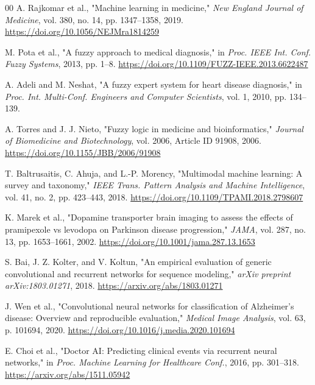 \documentclass[conference]{IEEEtran}
\begin{document}
\begin{thebibliography}{00}
A. Rajkomar et al., "Machine learning in medicine," \textit{New England Journal of Medicine}, vol. 380, no. 14, pp. 1347--1358, 2019. \href{https://doi.org/10.1056/NEJMra1814259}{https://doi.org/10.1056/NEJMra1814259}

M. Pota et al., "A fuzzy approach to medical diagnosis," in \textit{Proc. IEEE Int. Conf. Fuzzy Systems}, 2013, pp. 1--8. \href{https://doi.org/10.1109/FUZZ-IEEE.2013.6622487}{https://doi.org/10.1109/FUZZ-IEEE.2013.6622487}

A. Adeli and M. Neshat, "A fuzzy expert system for heart disease diagnosis," in \textit{Proc. Int. Multi-Conf. Engineers and Computer Scientists}, vol. 1, 2010, pp. 134--139.

A. Torres and J. J. Nieto, "Fuzzy logic in medicine and bioinformatics," \textit{Journal of Biomedicine and Biotechnology}, vol. 2006, Article ID 91908, 2006. \href{https://doi.org/10.1155/JBB/2006/91908}{https://doi.org/10.1155/JBB/2006/91908}

T. Baltrusaitis, C. Ahuja, and L.-P. Morency, "Multimodal machine learning: A survey and taxonomy," \textit{IEEE Trans. Pattern Analysis and Machine Intelligence}, vol. 41, no. 2, pp. 423--443, 2018. \href{https://doi.org/10.1109/TPAMI.2018.2798607}{https://doi.org/10.1109/TPAMI.2018.2798607}

K. Marek et al., "Dopamine transporter brain imaging to assess the effects of pramipexole vs levodopa on Parkinson disease progression," \textit{JAMA}, vol. 287, no. 13, pp. 1653--1661, 2002. \href{https://doi.org/10.1001/jama.287.13.1653}{https://doi.org/10.1001/jama.287.13.1653}

S. Bai, J. Z. Kolter, and V. Koltun, "An empirical evaluation of generic convolutional and recurrent networks for sequence modeling," \textit{arXiv preprint arXiv:1803.01271}, 2018. \href{https://arxiv.org/abs/1803.01271}{https://arxiv.org/abs/1803.01271}

J. Wen et al., "Convolutional neural networks for classification of Alzheimer's disease: Overview and reproducible evaluation," \textit{Medical Image Analysis}, vol. 63, p. 101694, 2020. \href{https://doi.org/10.1016/j.media.2020.101694}{https://doi.org/10.1016/j.media.2020.101694}

E. Choi et al., "Doctor AI: Predicting clinical events via recurrent neural networks," in \textit{Proc. Machine Learning for Healthcare Conf.}, 2016, pp. 301--318. \href{https://arxiv.org/abs/1511.05942}{https://arxiv.org/abs/1511.05942}


\end{thebibliography}
\end{document}
